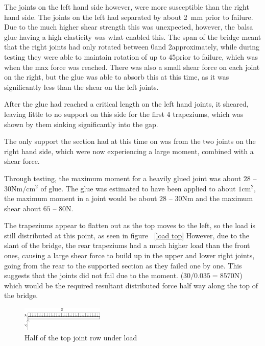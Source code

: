 \documentclass[12pt]{article}
\begin{document}
The joints on the left hand side however, were more susceptible than the right hand side. The joints on the left had separated by about 2~mm prior to failure. Due to the much higher shear strength this was unexpected, however, the balsa glue having a high elasticity was what enabled this. The span of the bridge meant that the right joints had only rotated between 0\textdegree and 2\textdegree approximately, while during testing they were able to maintain rotation of up to 45\textdegree prior to failure, which was when the max force was reached. There was also a small shear force on each joint on the right, but the glue was able to absorb this at this time, as it was significantly less than the shear on the left joints.

After the glue had reached a critical length on the left hand joints, it sheared, leaving little to no support on this side for the first 4 trapeziums, which was shown by them sinking significantly into the gap.

The only support the section had at this time on was from the two joints on the right hand side, which were now experiencing a large moment, combined with a shear force. 

Through testing, the maximum moment for a heavily glued joint was about $28$ -- $30\mathrm{Nm/cm^2}$ of glue. The glue was estimated to have been applied to about $1\mathrm{cm^2}$, the maximum moment in a joint would be about $28$ -- $30\mathrm{Nm}$ and the maximum shear about $65$ -- $80\mathrm{N}$. 

The trapeziums appear to flatten out as the top moves to the left, so the load is still distributed at this point, as seen in figure ~\ref{load top} However, due to the slant of the bridge, the rear trapeziums had a much higher load than the front ones, causing a large shear force to build up in the upper and lower right joints, going from the rear to the supported section as they failed one by one. This suggests that the joints did not fail due to the moment. ($30 / 0.035 = 8570\mathrm{N}$) which would be the required resultant distributed force half way along the top of the bridge. 

 			\begin{figure}[h!]
				\centering
				\includegraphics[width=0.35\textwidth]{loadtop}
				\caption{Half of the top joint row under load}
				\label{loadtop}
				\end{figure}
\end{document}
